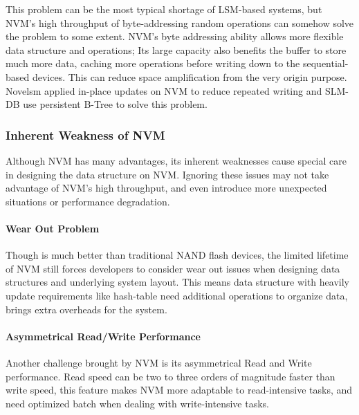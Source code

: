This problem can be the most typical shortage of LSM-based systems, but NVM's high throughput of byte-addressing random operations can somehow solve the problem to some extent. NVM's byte addressing ability allows more flexible data structure and operations; Its large capacity also benefits the buffer to store much more data, caching more operations before writing down to the sequential-based devices. This can reduce space amplification from the very origin purpose. Novelsm\cite{kannan2018redesigning} applied in-place updates on NVM to reduce repeated writing and SLM-DB use persistent B-Tree to solve this problem.


%

\subsubsection{Inherent Weakness of NVM}
Although NVM has many advantages, its inherent weaknesses cause special care in designing the data structure on NVM. Ignoring these issues may not take advantage of NVM's high throughput, and even introduce more unexpected situations or performance degradation.

\paragraph{Wear Out Problem}
Though is much better than traditional NAND flash devices, the limited lifetime of NVM still forces developers to consider wear out issues when designing data structures and underlying system layout\cite{dulloor2014system,van2018managing}. This means data structure with heavily update requirements like hash-table need additional operations to organize data, brings extra overheads for the system. 

\paragraph{Asymmetrical Read/Write Performance}
Another challenge brought by NVM is its asymmetrical Read and Write performance\cite{wu2017early}. Read speed can be two to three orders of magnitude faster than write speed, this feature makes NVM more adaptable to read-intensive tasks, and need optimized batch when dealing with write-intensive tasks.

